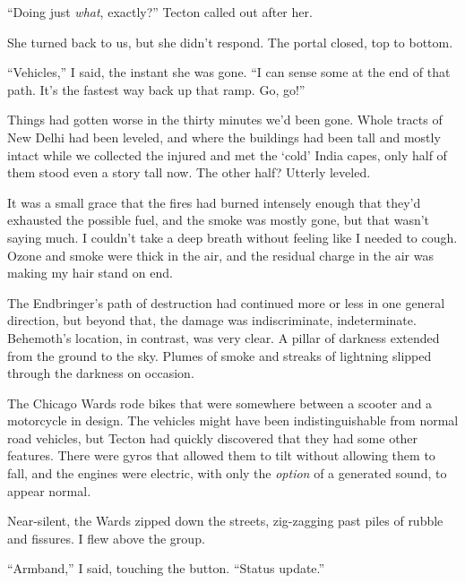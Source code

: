 ``Doing just \emph{what}, exactly?''  Tecton called out after her.



She turned back to us, but she didn't respond.  The portal closed, top to bottom.



``Vehicles,'' I said, the instant she was gone.  ``I can sense some at the end of that path.  It's the fastest way back up that ramp.  Go, go!''



\sectionbreak



Things had gotten worse in the thirty minutes we'd been gone.  Whole tracts of New Delhi had been leveled, and where the buildings had been tall and mostly intact while we collected the injured and met the `cold' India capes, only half of them stood even a story tall now.  The other half?  Utterly leveled.



It was a small grace that the fires had burned intensely enough that they'd exhausted the possible fuel, and the smoke was mostly gone, but that wasn't saying much.  I couldn't take a deep breath without feeling like I needed to cough.  Ozone and smoke were thick in the air, and the residual charge in the air was making my hair stand on end.



The Endbringer's path of destruction had continued more or less in one general direction, but beyond that, the damage was indiscriminate, indeterminate.  Behemoth's location, in contrast, was very clear.  A pillar of darkness extended from the ground to the sky.  Plumes of smoke and streaks of lightning slipped through the darkness on occasion.



The Chicago Wards rode bikes that were somewhere between a scooter and a motorcycle in design.  The vehicles might have been indistinguishable from normal road vehicles, but Tecton had quickly discovered that they had some other features.  There were gyros that allowed them to tilt without allowing them to fall, and the engines were electric, with only the \emph{option} of a generated sound, to appear normal.



Near-silent, the Wards zipped down the streets, zig-zagging past piles of rubble and fissures.   I flew above the group.



``Armband,'' I said, touching the button.  ``Status update.''



